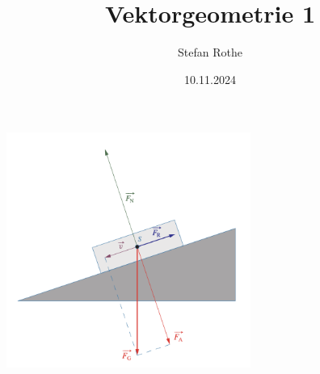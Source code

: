 \documentclass[parskip=half]{scrartcl}
\title{Vektorgeometrie 1}
\author{Stefan Rothe}
\date{10.11.2024}
\begin{document}
  \maketitle
  \thispagestyle{firstpage}
  \begin{center}
    \includegraphics[width=0.6\textwidth]{title.png}
  \end{center}
  \tableofcontents
  \newpage
  
  
  
  
  
\end{document}
